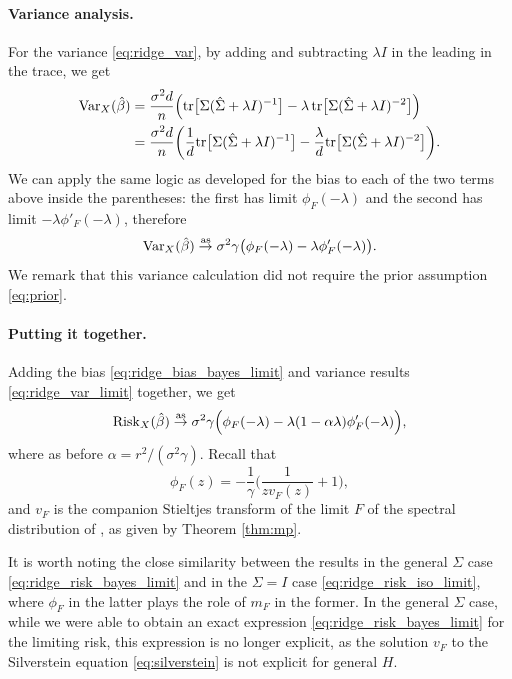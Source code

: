 \documentclass{article}
\begin{document}
\paragraph{Variance analysis.}

For the variance \eqref{eq:ridge_var}, by adding and subtracting $\lambda I$ in
the leading \smash{$\hSigma$} in the trace, we get 
\begin{align*}
\mathrm{Var}_X(\hat{\beta}) 
&= \frac{\sigma^2 d}{n} \Big( \mathrm{tr} \big[ \Sigma ( \hat\Sigma + \lambda I)^{-1} \big] -
  \lambda \, \mathrm{tr} \big[ \Sigma (\hat\Sigma + \lambda I)^{-2} \big] \Big) \\
&= \frac{\sigma^2 d}{n} \bigg( \frac{1}{d} \mathrm{tr} \big[ \Sigma ( \hat\Sigma + \lambda 
  I)^{-1} \big] -\frac{\lambda}{d} \mathrm{tr} \big[ \Sigma (\hat\Sigma + \lambda I)^{-2} 
  \big] \bigg).
\end{align*}
We can apply the same logic as developed for the bias to each of the two terms
above inside the parentheses: the first has limit $\phi_F(-\lambda)$ and the
second has limit $-\lambda \phi'_F(-\lambda)$, therefore   
\begin{equation}
\label{eq:ridge_var_limit}
\mathrm{Var}_X(\hat{\beta}) \overset{\mathrm{as}}{\to} \sigma^2 \gamma \big( \phi_F(-\lambda) - \lambda 
\phi'_F(-\lambda) \big).
\end{equation}
We remark that this variance calculation did not require the prior assumption
\eqref{eq:prior}.  

\paragraph{Putting it together.}

Adding the bias \eqref{eq:ridge_bias_bayes_limit} and variance results
\eqref{eq:ridge_var_limit} together, we get
\begin{equation}
\label{eq:ridge_risk_bayes_limit}
\mathrm{Risk}_X(\hat{\beta}) \overset{\mathrm{as}}{\to} \sigma^2 \gamma \Big( \phi_F(-\lambda) - \lambda (1 -
\alpha \lambda) \phi'_F(-\lambda) \Big),  
\end{equation}
where as before $\alpha = r^2 / (\sigma^2 \gamma)$. Recall that 
 \[
\phi_F(z) = -\frac{1}{\gamma} \bigg( \frac{1}{z v_F(z)} + 1 \bigg),
\]
and $v_F$ is the companion Stieltjes transform of the limit $F$ of the spectral
distribution of \smash{$\hSigma$}, as given by Theorem \ref{thm:mp}.

It is worth noting the close similarity between the results in the general
$\Sigma$ case \eqref{eq:ridge_risk_bayes_limit} and in the $\Sigma = I$ case  
\eqref{eq:ridge_risk_iso_limit}, where $\phi_F$ in the latter plays the role of
$m_F$ in the former. In the general $\Sigma$ case, while we were able to obtain
an exact expression \eqref{eq:ridge_risk_bayes_limit} for the limiting risk,
this expression is no longer explicit, as the solution $v_F$ to the
Silverstein equation \eqref{eq:silverstein} is not explicit for general $H$. 
\end{document}
